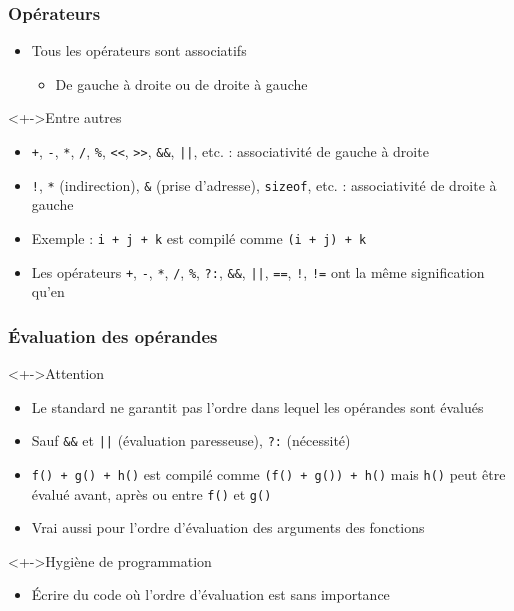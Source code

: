 \begin{frame}
\frametitle{Opérateurs}
\begin{itemize}[<+->]
\item Tous les opérateurs sont associatifs
	\begin{itemize}
	\item De gauche à droite ou de droite à gauche
	\end{itemize}
\end{itemize}
\begin{exampleblock}<+->{Entre autres}
	\begin{itemize}[<+->]
	\item \texttt{+}, \texttt{-}, \texttt{*}, \texttt{/}, \texttt{\%}, \texttt{<<}, \texttt{>>}, \texttt{\&\&}, \texttt{||}, etc. : associativité de gauche à droite
	\item \texttt{!}, \texttt{*} (indirection), \texttt{\&} (prise d'adresse), \lstinline|sizeof|, etc. : associativité de droite à gauche 
	\end{itemize}
\end{exampleblock}
\begin{itemize}[<+->]
\item Exemple : \texttt{i + j + k} est compilé comme \texttt{(i + j) + k}
\item Les opérateurs \texttt{+}, \texttt{-}, \texttt{*}, \texttt{/}, \texttt{\%}, \texttt{?:}, \texttt{\&\&}, \texttt{||}, \texttt{==}, \texttt{!}, \texttt{!=} ont la même signification qu’en \java
\end{itemize}

\end{frame}

\begin{frame}
\frametitle{Évaluation des opérandes}
\begin{alertblock}<+->{Attention}
	\begin{itemize}[<+->]
	\item Le standard ne garantit pas l'ordre dans lequel les opérandes sont évalués
	\item Sauf \texttt{\&\&} et \texttt{||} (évaluation paresseuse), \texttt{?:} (nécessité)
	\end{itemize}
\end{alertblock}
\begin{itemize}[<+->]
\item \texttt{f() + g() + h()} est compilé comme \texttt{(f() + g()) + h()} mais \texttt{h()} peut être évalué avant, après ou entre \texttt{f()} et \texttt{g()}
\item Vrai aussi pour l'ordre d'évaluation des arguments des fonctions
\end{itemize}
\begin{block}<+->{Hygiène de programmation}
	\begin{itemize}[<+->]
	\item Écrire du code où l'ordre d'évaluation est sans importance
	\end{itemize}
\end{block}
\end{frame}

